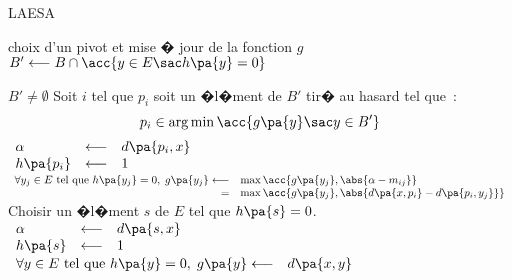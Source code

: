 \begin{xalgorithm}{LAESA}
            \begin{xalgostep}{choix d'un pivot et mise � jour de la fonction $g$} \label{classif_laesa_step_b}
                $B' \longleftarrow B \cap \acc{ y \in E \sac h\pa{y} = 0}$ \\
                \begin{xif}{$B' \neq \emptyset$}
                    Soit $i$ tel que $p_i$ soit un �l�ment de $B'$ tir� au hasard tel que~: \\ 
                                    $$p_i \in \arg \min \acc{ g\pa{y} \sac y \in B'}$$
                    $\begin{array}{lll}
                    \alpha         &\longleftarrow& d\pa{p_i,x} \\
                    h\pa{p_i} &\longleftarrow& 1 
                    \end{array}$ \\
                    $\begin{array}{rl}
                    \forall y_j \in E \text{ tel que } h\pa{y_j} = 0, \; g\pa{y_j} \longleftarrow &
                                            \max \acc {    g\pa{y_j} , \abs{ \alpha - m_{ij} }  } \\ = &
                                            \max \acc {    g\pa{y_j} , \abs{ d\pa{x,p_i} - d\pa{p_i, y_j} }  } 
                    \end{array}$
                \xelse        
                    Choisir un �l�ment $s$ de $E$ tel que $h\pa{s} = 0$. \\
                    $\begin{array}{lll}
                    \alpha         &\longleftarrow& d\pa{s,x} \\
                    h\pa{s}   &\longleftarrow& 1 
                    \end{array}$ \\
                    $\begin{array}{rl}
                    \forall y   \in E \text{ tel que } h\pa{y} = 0, \; g\pa{y} \longleftarrow & d\pa{x,y}
                    \end{array}$
                
                \end{xif}
                    
                    
                    
            \end{xalgostep}
            
            \possiblecut
            

\end{xalgorithm}
